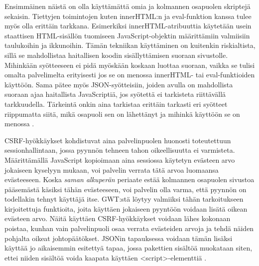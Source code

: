 Ensimmäinen näistä on olla käyttämättä omia ja kolmannen osapuolen skriptejä sekaisin. Tiettyjen toimintojen kuten innerHTML:n ja eval-funktion kanssa tulee myös olla erittäin tarkkana.
Esimerkiksi innerHTML-atribuuttia käytetään usein staattisen HTML-sisällön tuomiseen JavaScript-objektin määrittämiin valmiisiin taulukoihin ja ikkunoihin. Tämän tekniikan käyttäminen on 
kuitenkin riskialtista, sillä se mahdollistaa haitallisen koodin sisällyttämisen suoraan sivustolle. Mihinkään syötteeseen ei pidä myöskään koskaan luottaa suoraan, vaikka se tulisi omalta 
palvelimelta erityisesti jos se on menossa innerHTML- tai eval-funktioiden käyttöön. Sama pätee myös JSON-syötteisiin, joiden avulla on mahdollista suoraan ajaa haitallista JavaScriptiä, jos 
syötettä ei tarkisteta riittävällä tarkkuudella. Tärkeintä onkin aina tarkistaa erittäin tarkasti eri syötteet riippumatta siitä, mikä osapuoli sen on lähettänyt ja mihinkä käyttöön se on
menossa \cite{GWTsecurity}.

CSRF-hyökkäykset kohdistuvat aina palvelinpuolen huonosti toteutettuun sessionhallintaan, jossa pyynnön tehneen tahon oikeellisuutta ei varmisteta. Määrittämällä JavaScript kopioimaan aina 
sessiossa käytetyn evästeen arvo jokaiseen kyselyyn mukaan, voi palvelin verrata tätä arvoa luomaansa evästeeseen. Koska \emph{saman alkuperän} periaate estää kolmannen osapuolen sivustoa 
pääsemästä käsiksi tähän evästeeseen, voi palvelin olla varma, että pyynnön on todellakin tehnyt käyttäjä itse. GWT:stä löytyy valmiiksi tähän tarkoitukseen kirjoitettuja funktioita, joita
käyttäen jokaiseen pyyntöön voidaan lisätä oikean evästeen arvo. Näitä käyttäen CSRF-hyökkäykset voidaan lähes kokonaan poistaa, kunhan vain palvelinpuoli osaa verrata evästeiden arvoja 
ja tehdä näiden pohjalta oikeat johtopäätökset. JSONin tapauksessa voidaan tämän lisäksi käyttää jo aikaisemmin esitettyä tapaa, jossa pakettien sisältöä muokataan siten, ettei niiden
sisältöä voida kaapata käyttäen <script>-elementtiä \cite{GWTsecurity}.


